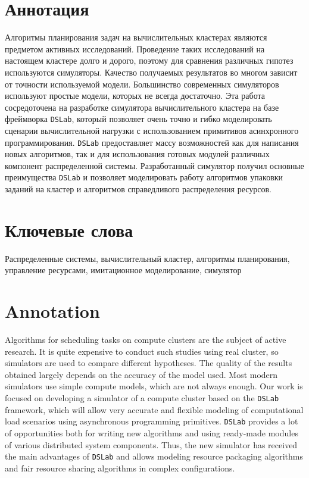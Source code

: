 
{

\section*{Аннотация}

Алгоритмы планирования задач на вычислительных кластерах являются предметом активных исследований. Проведение таких исследований на настоящем кластере долго и дорого, поэтому для сравнения различных гипотез используются симуляторы. Качество получаемых результатов во многом зависит от точности используемой модели. Большинство современных симуляторов используют простые модели, которых не всегда достаточно. Эта работа сосредоточена на разработке симулятора вычислительного кластера на базе фреймворка \texttt{DSLab}, который позволяет очень точно и гибко моделировать сценарии вычислительной нагрузки с использованием примитивов асинхронного программирования. \texttt{DSLab} предоставляет массу возможностей как для написания новых алгоритмов, так и для использования готовых модулей различных компонент распределенной системы. Разработанный симулятор получил основные преимущества \texttt{DSLab} и позволяет моделировать работу алгоритмов упаковки заданий на кластер и алгоритмов справедливого распределения ресурсов.

\section*{Ключевые слова}

Распределенные системы, вычислительный кластер, алгоритмы планирования, управление ресурсами, имитационное моделирование, симулятор

\section*{Annotation}
Algorithms for scheduling tasks on compute clusters are the subject of active research. It is quite expensive to conduct such studies using real cluster, so simulators are used to compare different hypotheses. The quality of the results obtained largely depends on the accuracy of the model used. Most modern simulators use simple compute models, which are not always enough. Our work is focused on developing a simulator of a compute cluster based on the \texttt{DSLab} framework, which will allow very accurate and flexible modeling of computational load scenarios using asynchronous programming primitives. \texttt{DSLab} provides a lot of opportunities both for writing new algorithms and using ready-made modules of various distributed system components. Thus, the new simulator has received the main advantages of \texttt{DSLab} and allows modeling resource packaging algorithms and fair resource sharing algorithms in complex configurations.


}
